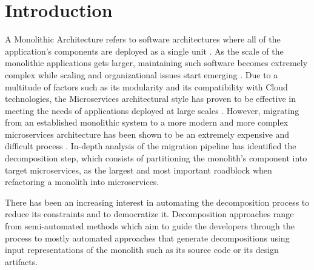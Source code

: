 \section{Introduction}
A Monolithic Architecture refers to software architectures where all of the application’s components are deployed as a single unit \cite{newman2019monolith}. As the scale of the monolithic applications gets larger, maintaining such software becomes extremely complex while scaling and organizational issues start emerging \cite{soundcloud2024}. Due to a multitude of factors such as its modularity and its compatibility with Cloud technologies, the Microservices architectural style has proven to be effective in meeting the needs of applications deployed at large scales \cite{spotify2022,netflix2015,soundcloud2024,vayghan2019availability,vayghan2021stateful,almarimi2019apirec}. However, migrating from an established monolithic system to a more modern and more complex microservices architecture has been shown to be an extremely expensive and difficult process \cite{rosati2019migrationcost,fritzsch_2019_migrationindustry,kalske2018m2mchallenges,francesco_2018_idustrialsurvey,vayghan2018experience}. In-depth analysis of the migration pipeline \cite{faustino2022stepwise,mazzara2021casestudy} has identified the decomposition step, which consists of partitioning the monolith's component into target microservices, as the largest and most important roadblock when refactoring a monolith into microservices. 

There has been an increasing interest \cite{Abgaz2023decompsurvey,oumoussa2024decompsurvey} in automating the decomposition process to reduce its constraints and to democratize it. Decomposition approaches range from semi-automated methods \cite{gysel2016servicecutter,li2019dataflowdec} which aim to guide the developers through the process to mostly automated approaches \cite{mathai2022chgnn,jin2021fosci,kalia2021mono2micro,khaled2022hydecomp,yedida2023deeply,aldebagy2021code2vec} that generate decompositions using input representations of the monolith such as its source code or its design artifacts. 

